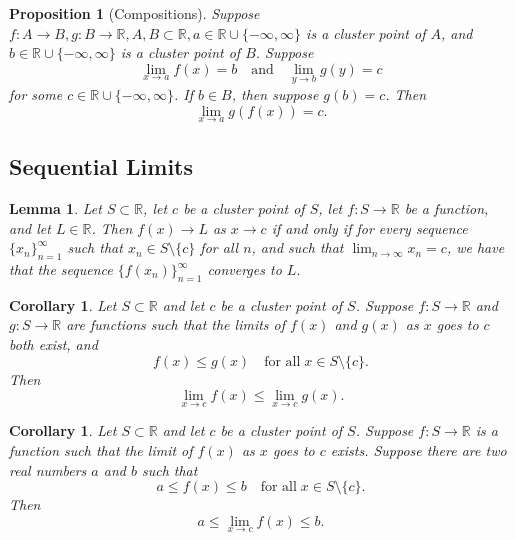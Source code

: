 \documentclass{article}
\newtheorem{lemma}[theorem]{Lemma}
\newtheorem{corollary}[theorem]{Corollary}
\newtheorem{prop}[theorem]{Proposition}
\theoremstyle{definition}
\begin{document}
\begin{prop}[Compositions]
    Suppose \( f: A \rightarrow B, g: B \rightarrow \mathbb{R}, A, B \subset \mathbb{R}, a \in \mathbb{R} \cup \{-\infty, \infty\} \) is a cluster point of \( A \), and \( b \in \mathbb{R} \cup \{-\infty, \infty\} \) is a cluster point of \( B \). Suppose
\[
\lim_{x \rightarrow a} f(x) = b \quad \text{and} \quad \lim_{y \rightarrow b} g(y) = c
\]
for some \( c \in \mathbb{R} \cup \{-\infty, \infty\} \). If \( b \in B \), then suppose \( g(b) = c \). Then
\[
\lim_{x \rightarrow a} g(f(x)) = c.
\]
\end{prop}


\subsection{Sequential Limits}

\begin{lemma}
    Let \( S \subset \mathbb{R} \), let \( c \) be a cluster point of \( S \), let \( f: S \rightarrow \mathbb{R} \) be a function, and let \( L \in \mathbb{R} \). Then \( f(x) \rightarrow L \) as \( x \rightarrow c \) if and only if for every sequence \( \{x_n\}_{n=1}^{\infty} \) such that \( x_n \in S \setminus \{c\} \) for all \( n \), and such that \( \lim_{n \to \infty} x_n = c \), we have that the sequence \( \{f(x_n)\}_{n=1}^{\infty} \) converges to \( L \). 
\end{lemma}

\begin{corollary}
    Let \( S \subset \mathbb{R} \) and let \( c \) be a cluster point of \( S \). Suppose \( f: S \rightarrow \mathbb{R} \) and \( g: S \rightarrow \mathbb{R} \) are functions such that the limits of \( f(x) \) and \( g(x) \) as \( x \) goes to \( c \) both exist, and
\[ f(x) \leq g(x) \quad \text{for all} \; x \in S \setminus \{c\}. \]
Then
\[ \lim_{x \to c} f(x) \leq \lim_{x \to c} g(x). \]
\end{corollary}

\begin{corollary}
    Let \( S \subset \mathbb{R} \) and let \( c \) be a cluster point of \( S \). Suppose \( f: S \rightarrow \mathbb{R} \) is a function such that the limit of \( f(x) \) as \( x \) goes to \( c \) exists. Suppose there are two real numbers \( a \) and \( b \) such that
\[ a \leq f(x) \leq b \quad \text{for all} \; x \in S \setminus \{c\}. \]
Then
\[ a \leq \lim_{x \to c} f(x) \leq b. \]
\end{corollary}
\end{document}
